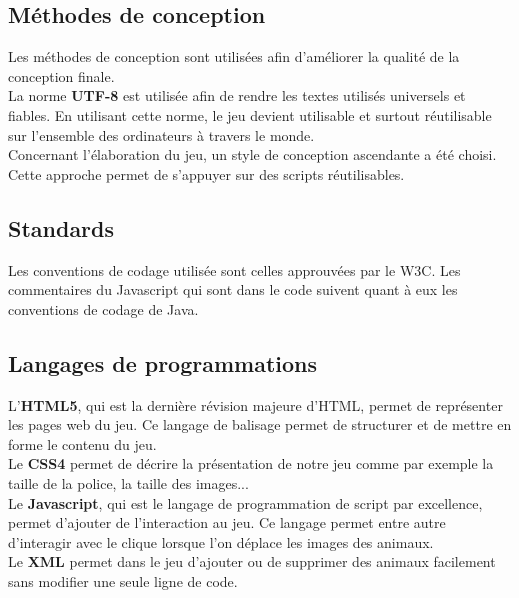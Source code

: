 \documentclass{article}
\begin{document}
\subsection{M\'ethodes de conception}
\hspace*{0.6cm}Les m\'ethodes de conception sont utilis\'ees afin d'am\'eliorer la qualit\'e de la conception finale.
\vspace{0.5cm}\\
\hspace*{0.6cm}La norme \textbf{UTF-8} est utilis\'ee afin de rendre les textes utilis\'es universels et fiables. En utilisant cette norme, le jeu devient utilisable et surtout r\'eutilisable sur l'ensemble des ordinateurs \`a travers le monde.
\vspace{0.5cm}\\
\hspace*{0.6cm}Concernant l'\'elaboration du jeu, un style de conception ascendante a \'et\'e choisi. Cette approche permet de s'appuyer sur des scripts r\'eutilisables.

\subsection{Standards}

\hspace*{0.6cm}Les conventions de codage utilis\'ee sont celles approuv\'ees par le W3C. Les commentaires du Javascript qui sont dans le code suivent quant \`a eux les conventions de codage de Java.

\subsection{Langages de programmations}

\hspace*{0.6cm}L'\textbf{HTML5}, qui est la derni\`ere r\'evision majeure d'HTML, permet de repr\'esenter les pages web du jeu. Ce langage de balisage permet de structurer et de mettre en forme le contenu du jeu.\\
\hspace*{0.6cm}Le \textbf{CSS4} permet de d\'ecrire la pr\'esentation de notre jeu comme par exemple la taille de la police, la taille des images...\\
\hspace*{0.6cm}Le \textbf{Javascript}, qui est le langage de programmation de script par excellence, permet d'ajouter de l'interaction au jeu. Ce langage permet entre autre d'interagir avec le clique lorsque l'on d\'eplace les images des animaux.\\
\hspace*{0.6cm}Le \textbf{XML} permet dans le jeu d'ajouter ou de supprimer des animaux facilement sans modifier une seule ligne de code.
\end{document}
